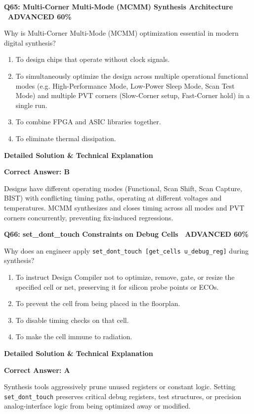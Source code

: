 \documentclass[11pt,a4paper]{article}
\newcommand{\badgeadv}{{\color{white}\colorbox{advred}{\bfseries\sffamily\tiny\ ADVANCED 60\%\ }}}
\newenvironment{qbox}[2]{%
  \begin{mdframed}[style=qstyle]%
  {\bfseries\sffamily\color{primaryblue}#1 \hfill #2}\par\vspace{2pt}%
}{%
  \end{mdframed}%
}
\newenvironment{ansbox}{%
  \begin{mdframed}[style=ansstyle]%
  {\bfseries\sffamily\color{ansgreen}\small Detailed Solution \& Technical Explanation}\par\vspace{2pt}\small%
}{%
  \end{mdframed}%
}
\begin{document}
\begin{qbox}{Q65: Multi-Corner Multi-Mode (MCMM) Synthesis Architecture}{\badgeadv}
Why is Multi-Corner Multi-Mode (MCMM) optimization essential in modern digital synthesis?
\begin{enumerate}[label=\textbf{\Alph*.}]
  \item To design chips that operate without clock signals.
  \item To simultaneously optimize the design across multiple operational functional modes (e.g. High-Performance Mode, Low-Power Sleep Mode, Scan Test Mode) and multiple PVT corners (Slow-Corner setup, Fast-Corner hold) in a single run.
  \item To combine FPGA and ASIC libraries together.
  \item To eliminate thermal dissipation.
\end{enumerate}
\end{qbox}
\begin{ansbox}
\textbf{Correct Answer: B}

Designs have different operating modes (Functional, Scan Shift, Scan Capture, BIST) with conflicting timing paths, operating at different voltages and temperatures. MCMM synthesizes and closes timing across all modes and PVT corners concurrently, preventing fix-induced regressions.
\end{ansbox}

\begin{qbox}{Q66: set\_dont\_touch Constraints on Debug Cells}{\badgeadv}
Why does an engineer apply \texttt{set\_dont\_touch [get\_cells u\_debug\_reg]} during synthesis?
\begin{enumerate}[label=\textbf{\Alph*.}]
  \item To instruct Design Compiler not to optimize, remove, gate, or resize the specified cell or net, preserving it for silicon probe points or ECOs.
  \item To prevent the cell from being placed in the floorplan.
  \item To disable timing checks on that cell.
  \item To make the cell immune to radiation.
\end{enumerate}
\end{qbox}
\begin{ansbox}
\textbf{Correct Answer: A}

Synthesis tools aggressively prune unused registers or constant logic. Setting \texttt{set\_dont\_touch} preserves critical debug registers, test structures, or precision analog-interface logic from being optimized away or modified.
\end{ansbox}
\end{document}

